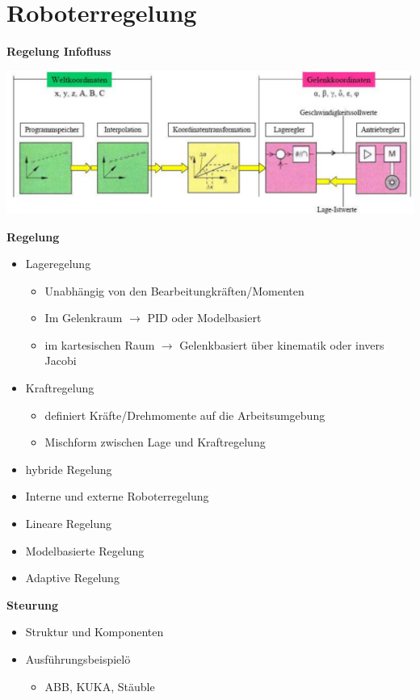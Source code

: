 \section{Roboterregelung }
\textbf{Regelung Infofluss}
\begin{center}
    \includegraphics[width=0.9\linewidth]{./bilder/RegelungInfofluss}
\end{center}

\begin{minipage}[t]{0.5\linewidth}
    \textbf{Regelung}
    \begin{itemize}
        \item Lageregelung
        \begin{itemize}
            \item Unabhängig von den Bearbeitungkräften/Momenten
            \item Im Gelenkraum $\rightarrow$ PID oder Modelbasiert
            \item im kartesischen Raum $\rightarrow$ Gelenkbasiert über kinematik oder invers Jacobi
        \end{itemize}
        \item Kraftregelung
        \begin{itemize}
            \item definiert Kräfte/Drehmomente auf die Arbeitsumgebung
        \end{itemize}
        \begin{itemize}
            \item Mischform zwischen Lage und Kraftregelung
        \end{itemize}
        \item hybride Regelung
        \item Interne und externe Roboterregelung
        \item Lineare Regelung
        \item Modelbasierte Regelung
        \item Adaptive Regelung
    \end{itemize}
\end{minipage}
\begin{minipage}[t]{0.5\linewidth}
    \textbf{Steurung}
    \begin{itemize}
        \item Struktur und Komponenten
        \item Ausführungsbeispielö
        \begin{itemize}
            \item ABB, KUKA, Stäuble
        \end{itemize}
    \end{itemize}
\end{minipage}

